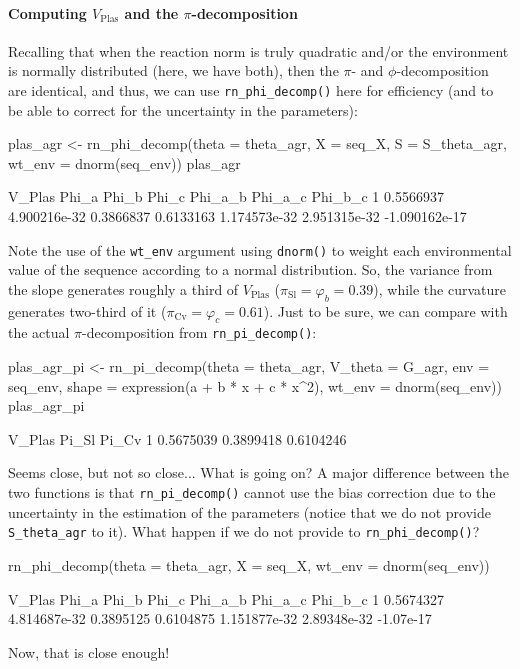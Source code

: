 \documentclass[a4paper,12pt,twoside]{article}
\begin{document}
\paragraph{Computing $V_{\text{Plas}}$ and the $\pi$-decomposition}
Recalling that when the reaction norm is truly quadratic and/or the environment is normally distributed (here, we have both), then the $\pi$- and $\phi$-decomposition are identical, and thus, we can use \texttt{rn\_phi\_decomp()} here for efficiency (and to be able to correct for the uncertainty in the parameters):
\begin{Rinput}
plas_agr <-
    rn_phi_decomp(theta  = theta_agr,
                  X      = seq_X,
                  S      = S_theta_agr,
                  wt_env = dnorm(seq_env))
plas_agr
\end{Rinput}
\begin{Routput}
     V_Plas        Phi_a     Phi_b     Phi_c      Phi_a_b      Phi_a_c       Phi_b_c
1 0.5566937 4.900216e-32 0.3866837 0.6133163 1.174573e-32 2.951315e-32 -1.090162e-17
\end{Routput}
Note the use of the \texttt{wt\_env} argument using \texttt{dnorm()} to weight each environmental value of the sequence according to a normal distribution.
So, the variance from the slope generates roughly a third of $V_{\text{Plas}}$ ($\pi_{\text{Sl}}=\varphi_{b} = 0.39$), while the curvature generates two-third of it ($\pi_{\text{Cv}}=\varphi_{c} = 0.61$).
Just to be sure, we can compare with the actual $\pi$-decomposition from \texttt{rn\_pi\_decomp()}:
\begin{Rinput}
plas_agr_pi <-
    rn_pi_decomp(theta   = theta_agr,
                    V_theta = G_agr,
                    env     = seq_env,
                    shape   = expression(a + b * x + c * x^2),
                    wt_env  = dnorm(seq_env))
plas_agr_pi
\end{Rinput}
\begin{Routput}
     V_Plas     Pi_Sl     Pi_Cv
1 0.5675039 0.3899418 0.6104246
\end{Routput}
Seems close, but not so close... What is going on? A major difference between the two functions is that \texttt{rn\_pi\_decomp()} cannot use the bias correction due to the uncertainty in the estimation of the parameters (notice that we do not provide \texttt{S\_theta\_agr} to it). What happen if we do not provide to \texttt{rn\_phi\_decomp()}?
\begin{Rinput}
rn_phi_decomp(theta  = theta_agr,
              X      = seq_X,
              wt_env = dnorm(seq_env))
\end{Rinput}
\begin{Routput}
     V_Plas        Phi_a     Phi_b     Phi_c      Phi_a_b     Phi_a_c   Phi_b_c
1 0.5674327 4.814687e-32 0.3895125 0.6104875 1.151877e-32 2.89348e-32 -1.07e-17
\end{Routput}
Now, that is close enough!
\end{document}
